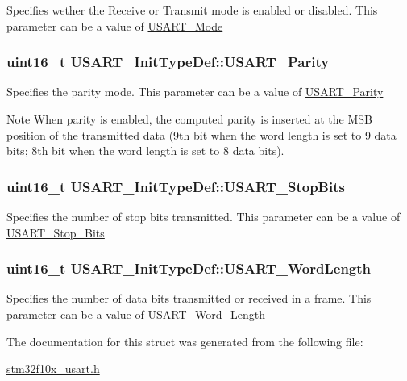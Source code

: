 \label{structUSART__InitTypeDef_a7d944d35d7d1fc79a63f249615148584}
Specifies wether the Receive or Transmit mode is enabled or disabled. This parameter can be a value of \hyperlink{group__USART__Mode}{USART\_\-Mode} \hypertarget{structUSART__InitTypeDef_a5ae66aba755bac37c5cf0dfbf529e2ed}{
\subsubsection[{USART\_\-Parity}]{\setlength{\rightskip}{0pt plus 5cm}uint16\_\-t {\bf USART\_\-InitTypeDef::USART\_\-Parity}}}
\label{structUSART__InitTypeDef_a5ae66aba755bac37c5cf0dfbf529e2ed}
Specifies the parity mode. This parameter can be a value of \hyperlink{group__USART__Parity}{USART\_\-Parity} \begin{DoxyNote}{Note}
When parity is enabled, the computed parity is inserted at the MSB position of the transmitted data (9th bit when the word length is set to 9 data bits; 8th bit when the word length is set to 8 data bits). 
\end{DoxyNote}
\hypertarget{structUSART__InitTypeDef_ac745bceb79a6c4c2640fd8e8ce6639d6}{
\subsubsection[{USART\_\-StopBits}]{\setlength{\rightskip}{0pt plus 5cm}uint16\_\-t {\bf USART\_\-InitTypeDef::USART\_\-StopBits}}}
\label{structUSART__InitTypeDef_ac745bceb79a6c4c2640fd8e8ce6639d6}
Specifies the number of stop bits transmitted. This parameter can be a value of \hyperlink{group__USART__Stop__Bits}{USART\_\-Stop\_\-Bits} \hypertarget{structUSART__InitTypeDef_a16d1fb7ccc2b51964f1bcfcbfba6d89d}{
\subsubsection[{USART\_\-WordLength}]{\setlength{\rightskip}{0pt plus 5cm}uint16\_\-t {\bf USART\_\-InitTypeDef::USART\_\-WordLength}}}
\label{structUSART__InitTypeDef_a16d1fb7ccc2b51964f1bcfcbfba6d89d}
Specifies the number of data bits transmitted or received in a frame. This parameter can be a value of \hyperlink{group__USART__Word__Length}{USART\_\-Word\_\-Length} 

The documentation for this struct was generated from the following file:\begin{DoxyCompactItemize}
\item 
\hyperlink{stm32f10x__usart_8h}{stm32f10x\_\-usart.h}\end{DoxyCompactItemize}
